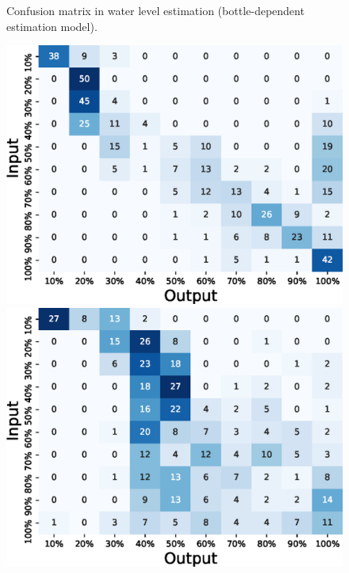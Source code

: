 \documentclass[manuscript,screen,review]{acmart}
\begin{document}
\begin{figure}[!t]
\begin{minipage}[t]{0.45\linewidth}
  \end{minipage}
  \caption{Confusion matrix in water level estimation (bottle-dependent estimation model).}
  \label{fig:confusion_matrix_10_dependent}
\end{figure}

\begin{figure}[!t]
  \centering
  \begin{minipage}[t]{0.45\linewidth}
    \centering
    \includegraphics[width=0.9\linewidth]{figures/confusion_matrix_10_independent_coffee.eps}
  \end{minipage}
  \begin{minipage}[t]{0.45\linewidth}
    \centering
    \includegraphics[width=0.9\linewidth]{figures/confusion_matrix_10_independent_dishwashing.eps}

\end{minipage}
\end{figure}
\end{document}

